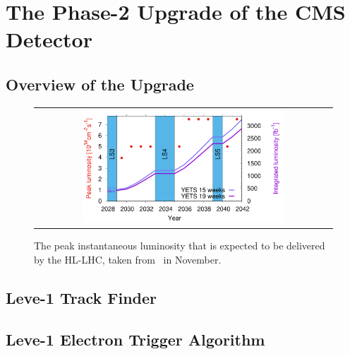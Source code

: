 \chapter{The Phase-2 Upgrade of the CMS Detector}
\label{chap:Upgrade}

\section{Overview of the Upgrade}

\begin{figure}[tbh!]
 \begin{center}
 \begin{tabular}{c}
 \includegraphics[width=0.7\textwidth]{figures/Part2/Upgrade/Lumi}
 \end{tabular}
 \caption{The peak instantaneous luminosity that is expected to be delivered by the \ac{HL-LHC}, taken from~\cite{LHC:plan} in November.}
 \label{fig:Lumi}
 \end{center}
\end{figure}

\section{Leve-1 Track Finder}

\section{Leve-1 Electron Trigger Algorithm}